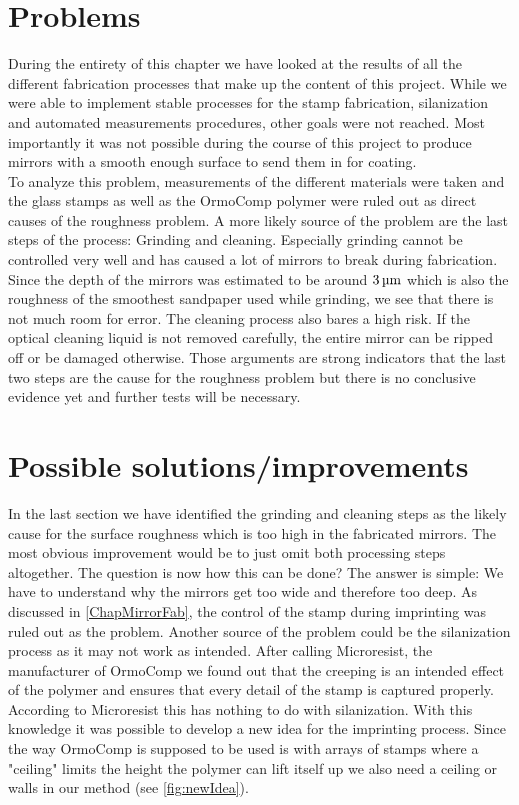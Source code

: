 \section{Problems}\label{ChapProblems}
During the entirety of this chapter we have looked at the results of all the different fabrication processes that make up the content of this project. While we were able to implement stable processes for the stamp fabrication, silanization and automated measurements procedures, other goals were not reached. Most importantly it was not possible during the course of this project to produce mirrors with a smooth enough surface to send them in for coating.\\
To analyze this problem, measurements of the different materials were taken and the glass stamps as well as the OrmoComp polymer were ruled out as direct causes of the roughness problem. A more likely source of the problem are the last steps of the process: Grinding and cleaning. Especially grinding cannot be controlled very well and has caused a lot of mirrors to break during fabrication. Since the depth of the mirrors was estimated to be around $3\um$ which is also the roughness of the smoothest sandpaper used while grinding, we see that there is not much room for error. The cleaning process also bares a high risk. If the optical cleaning liquid is not removed carefully, the entire mirror can be ripped off or be damaged otherwise. Those arguments are strong indicators that the last two steps are the cause for the roughness problem but there is no conclusive evidence yet and further tests will be necessary.

\section{Possible solutions/improvements}\label{ChapSolutions}
In the last section we have identified the grinding and cleaning steps as the likely cause for the surface roughness which is too high in the fabricated mirrors. The most obvious improvement would be to just omit both processing steps altogether. The question is now how this can be done? The answer is simple: We have to understand why the mirrors get too wide and therefore too deep. As discussed in \autoref{ChapMirrorFab}, the control of the stamp during imprinting was ruled out as the problem. Another source of the problem could be the silanization process as it may not work as intended. After calling Microresist, the manufacturer of OrmoComp we found out that the creeping is an intended effect of the polymer and ensures that every detail of the stamp is captured properly. According to Microresist this has nothing to do with silanization.
With this knowledge it was possible to develop a new idea for the imprinting process. Since the way OrmoComp is supposed to be used is with arrays of stamps where a "ceiling" limits the height the polymer can lift itself up we also need a ceiling or walls in our method (see \autoref{fig:newIdea}).

